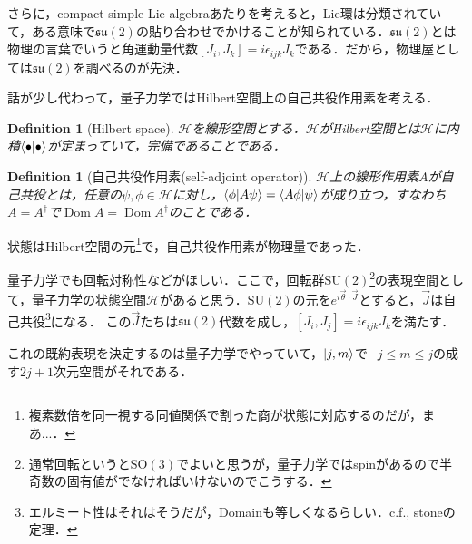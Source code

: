 \documentclass[dvipdfmx, a4paper, english]{jsarticle}
\theoremstyle{break}
\newtheorem{defn}[thm]{Definition}
\newcommand{\hilb}{\mathcal{H}}
\newcommand{\SO}{\mathrm{SO}}
\newcommand{\SU}{\mathrm{SU}}
\newcommand{\su}{\mathfrak{su}}
\DeclareMathOperator{\Dom}{Dom}
\numberwithin{equation}{section}
\begin{document}
	さらに，compact simple Lie algebraあたりを考えると，Lie環は分類されていて，ある意味で$\su(2)$の貼り合わせでかけることが知られている\cite{BB03663366}．$\su(2)$とは物理の言葉でいうと角運動量代数$[J_i, J_k] = i\epsilon_{ijk}J_k$である．だから，物理屋としては$\su(2)$を調べるのが先決．

	話が少し代わって，量子力学ではHilbert空間上の自己共役作用素を考える．
	\begin{defn}[Hilbert space]
			$\hilb$を線形空間とする．$\hilb$がHilbert空間とは$\hilb$に内積$\braket{\bullet}{\bullet}$が定まっていて，完備であることである．
	\end{defn}
	\begin{defn}[自己共役作用素(self-adjoint operator)]
			$\hilb$上の線形作用素$A$が自己共役とは，任意の$\psi, \phi \in \hilb$に対し，$\braket{\phi}{A\psi} = \braket{A\phi}{\psi}$が成り立つ，すなわち$A = A^{\dagger}$で$\Dom A = \Dom A^{\dagger}$のことである．
	\end{defn}

	状態はHilbert空間の元\footnote{複素数倍を同一視する同値関係で割った商が状態に対応するのだが，まあ...．}で，自己共役作用素が物理量であった．

	量子力学でも回転対称性などがほしい．ここで，回転群$\SU(2)$\footnote{通常回転というと$\SO(3)$でよいと思うが，量子力学ではspinがあるので半奇数の固有値がでなければいけないのでこうする．}の表現空間として，量子力学の状態空間$\hilb$があると思う．$\SU(2)$の元を$e^{i\vec{\theta}\cdot\vec{J}}$とすると，$\vec{J}$は自己共役\footnote{エルミート性はそれはそうだが，Domainも等しくなるらしい．c.f., stoneの定理．}になる．
	この$\vec{J}$たちは$\su(2)$代数を成し，$[J_{i}, J_{j}] = i\epsilon_{ijk}J_k$を満たす．

	これの既約表現を決定するのは量子力学でやっていて，$\ket{j, m}$で$-j\leq m \leq j$の成す$2j+1$次元空間がそれである．
\end{document}
